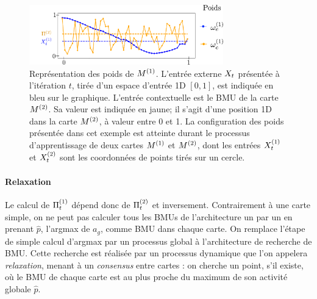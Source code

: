 \documentclass[../main]{subfiles}
\begin{document}
\begin{figure}
\centering
\includegraphics[width=0.75\textwidth]{weights_2som.pdf}
\caption{Représentation des poids de $M^{({1})}$. L'entrée externe $X_t$ présentée à l'itération $t$, tirée d'un espace d'entrée 1D $[0,1]$, est indiquée en bleu sur le graphique. L'entrée contextuelle  est le BMU de la carte $M^{({2})}$. Sa valeur est indiquée en jaune; il s'agit d'une position 1D dans la carte $M^{({2})}$, à valeur entre 0 et 1. La configuration des poids présentée dans cet exemple est atteinte durant le processus d'apprentissage de deux cartes $M^{({1})}$ et $M^{({2})}$, dont les entrées $X^{({1})}_t$ et $X^{({2})}_t$ sont les coordonnées de points tirés sur un cercle. \label{fig:2som_weights}}
\end{figure}
\paragraph{Relaxation}
Le calcul de $\Pi^{({1})}_t$ dépend donc de $\Pi^{({2})}_t$ et inversement. Contrairement à une carte simple, on ne peut pas calculer tous les BMUs de l'architecture un par un en prenant $\hat{p}$, l'argmax de $a_g$, comme BMU dans chaque carte.
On remplace l'étape de simple calcul d'argmax par un processus global à l'architecture de recherche de BMU. Cette recherche est réalisée par un processus dynamique que l'on appelera \emph{relaxation}, menant à un \emph{consensus} entre cartes : on cherche un point, s'il existe, où le BMU de chaque carte est au plus proche du maximum de son activité globale $\hat{p}$.
\end{document}
